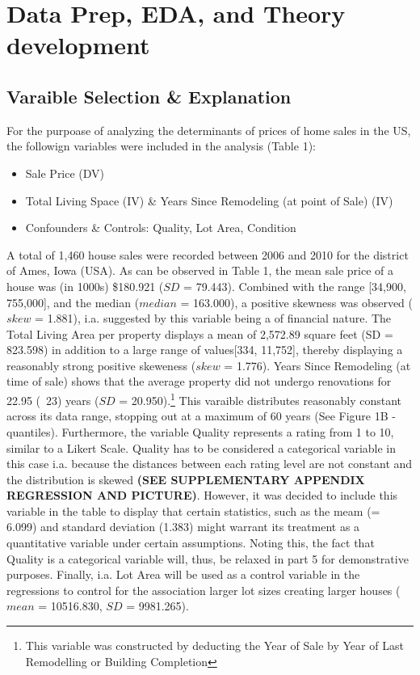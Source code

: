 \documentclass[a4paper]{article}
\begin{document}
\section{Data Prep, EDA, and Theory development}
\subsection{Varaible Selection \& Explanation}
For the purpoase of analyzing the determinants of prices of home sales in the US, the followign variables were included in the analysis (Table 1): 


\begin{itemize}
  \item Sale Price (DV)
  \item Total Living Space (IV) \& Years Since Remodeling (at point of Sale) (IV)
  \item Confounders \& Controls: Quality, Lot Area, Condition
\end{itemize}



A total of 1,460 house sales were recorded between 2006 and 2010 for the district of Ames, Iowa (USA).
As can be observed in Table 1, the mean sale price of a house was (in 1000s) \$180.921 ($SD$ = 79.443). Combined with the range [34,900, 755,000], and the median ($median$ = 163.000), a positive skewness was observed ($skew$ = 1.881), i.a. suggested by this variable being a of financial nature. The Total Living Area per property displays a mean of 2,572.89 square feet (SD = 823.598) in addition to a large range of values[334, 11,752], thereby displaying a reasonably strong positive skeweness ($skew$ = 1.776).  
Years Since Remodeling (at time of sale) shows that the average property did not undergo renovations for 22.95 (~23) years ($SD$ = 20.950).\footnote{This variable was constructed by deducting the Year of Sale by Year of Last Remodelling or Building Completion} This varaible distributes reasonably constant across its data range, stopping out at a maximum of 60 years (See Figure 1B - quantiles).
Furthermore, the variable Quality represents a rating from 1 to 10, similar to a Likert Scale. Quality has to be considered a categorical variable in this case i.a. because the distances between each rating level are not constant and the distribution is skewed \textbf{(SEE SUPPLEMENTARY APPENDIX REGRESSION AND PICTURE)}. However, it was decided to include this variable in the table to display that certain statistics, such as the meam (= 6.099) and standard deviation (1.383) might warrant its treatment as a quantitative variable under certain assumptions. Noting this, the fact that Quality is a categorical variable will, thus, be relaxed in part 5 for demonstrative purposes. Finally, i.a. Lot Area will be used as a control variable in the regressions to control for the association larger lot sizes creating larger houses ($mean$ = 10516.830, $SD$ = 9981.265). 
\end{document}
